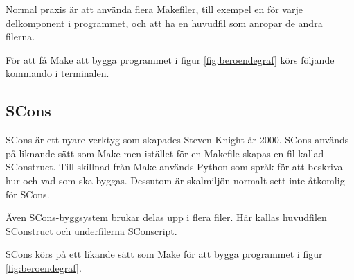 Normal praxis är att använda flera Makefiler, till exempel en för varje delkomponent i programmet, och att ha en huvudfil som anropar de andra filerna.

För att få Make att bygga programmet i figur \ref{fig:beroendegraf} körs följande kommando i terminalen. 


\subsection{SCons}
SCons är ett nyare verktyg som skapades Steven Knight år 2000. SCons används på liknande sätt som Make men istället för en Makefile skapas en fil kallad SConstruct. Till skillnad från Make används Python som språk för att beskriva hur och vad som ska byggas. Dessutom är skalmiljön normalt sett inte åtkomlig för SCons.

Även SCons-byggsystem brukar delas upp i flera filer. Här kallas huvudfilen SConstruct och underfilerna SConscript.

SCons körs på ett likande sätt som Make för att bygga programmet i figur \ref{fig:beroendegraf}. 


